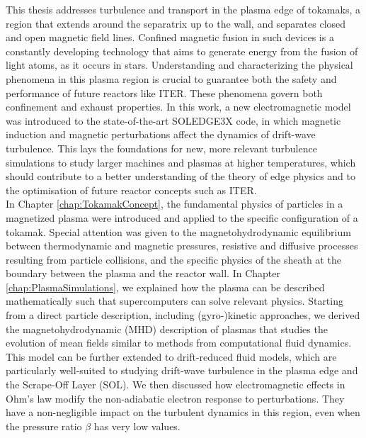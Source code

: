 This thesis addresses turbulence and transport in the plasma edge of tokamaks, a region that extends around the separatrix up to the wall, and separates closed and open magnetic field lines. Confined magnetic fusion in such devices is a constantly developing technology that aims to generate energy from the fusion of light atoms, as it occurs in stars. Understanding and characterizing the physical phenomena in this plasma region is crucial to guarantee both the safety and performance of future reactors like ITER. These phenomena govern both confinement and exhaust properties. In this work, a new electromagnetic model was introduced to the state-of-the-art SOLEDGE3X code, in which magnetic induction and magnetic perturbations affect the dynamics of drift-wave turbulence. This lays the foundations for new, more relevant turbulence simulations to study larger machines and plasmas at higher temperatures, which should contribute to a better understanding of the theory of edge physics and to the optimisation of future reactor concepts such as ITER. \\

In Chapter \ref{chap:TokamakConcept}, the fundamental physics of particles in a magnetized plasma were introduced and applied to the specific configuration of a tokamak. Special attention was given to the magnetohydrodynamic equilibrium between thermodynamic and magnetic pressures, resistive and diffusive processes resulting from particle collisions, and the specific physics of the sheath at the boundary between the plasma and the reactor wall. In Chapter \ref{chap:PlasmaSimulations}, we explained how the plasma can be described mathematically such that supercomputers can solve relevant physics. Starting from a direct particle description, including (gyro-)kinetic approaches, we derived the magnetohydrodynamic (MHD) description of plasmas that studies the evolution of mean fields similar to methods from computational fluid dynamics. This model can be further extended to drift-reduced fluid models, which are particularly well-suited to studying drift-wave turbulence in the plasma edge and the Scrape-Off Layer (SOL). We then discussed how electromagnetic effects in Ohm's law modify the non-adiabatic electron response to perturbations. They have a non-negligible impact on the turbulent dynamics in this region, even when the pressure ratio $\beta$ has very low values. \\

